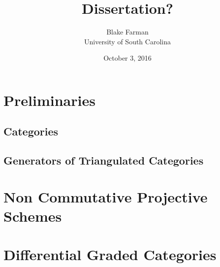 \documentclass[10pt]{book}
\author{Blake Farman\\University of South Carolina}
\title{Dissertation?}
\date{October 3, 2016}
\begin{document}

\tableofcontents

\newtheorem{thm}{Theorem}[section]
\newtheorem{lem}{Lemma}[section]
\newtheorem{cor}{Corollary}[section]
\newtheorem{prop}{Proposition}[section]

\theoremstyle{definition}
\newtheorem{defn}{Definition}[section]
\newtheorem{rmk}{Remark}[section]
\newtheorem{eg}{Example}[section]

\chapter{Preliminaries}
\section{Categories}

\section{Generators of Triangulated Categories}

\chapter{Non Commutative Projective Schemes}

\chapter{Differential Graded Categories}

\end{document}
